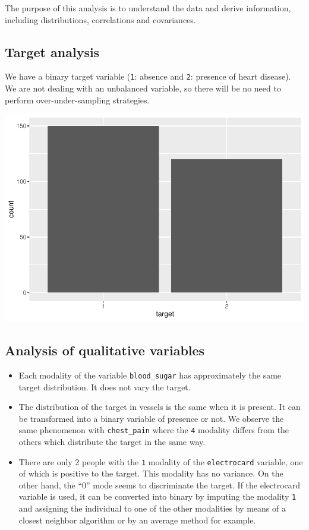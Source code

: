 \documentclass[
]{article}
\providecommand{\tightlist}{%
  \setlength{\itemsep}{0pt}\setlength{\parskip}{0pt}}
\begin{document}
The purpose of this analysis is to understand the data and derive
information, including distributions, correlations and covariances.

\hypertarget{target-analysis}{%
\subsection{Target analysis}\label{target-analysis}}

We have a binary target variable (\texttt{1}: absence and \texttt{2}:
presence of heart disease).\\
We are not dealing with an unbalanced variable, so there will be no need
to perform over-under-sampling strategies.

\includegraphics{hd_files/figure-latex/unnamed-chunk-13-1.pdf}

\hypertarget{analysis-of-qualitative-variables}{%
\subsection{Analysis of qualitative
variables}\label{analysis-of-qualitative-variables}}

\begin{itemize}
\tightlist
\item
  Each modality of the variable \texttt{blood\_sugar} has approximately
  the same target distribution. It does not vary the target.
\item
  The distribution of the target in vessels is the same when it is
  present. It can be transformed into a binary variable of presence or
  not. We observe the same phenomenon with \texttt{chest\_pain} where
  the \texttt{4} modality differs from the others which distribute the
  target in the same way.
\item
  There are only 2 people with the \texttt{1} modality of the
  \texttt{electrocard} variable, one of which is positive to the target.
  This modality has no variance. On the other hand, the ``0'' mode seems
  to discriminate the target. If the electrocard variable is used, it
  can be converted into binary by imputing the modality \texttt{1} and
  assigning the individual to one of the other modalities by means of a
  closest neighbor algorithm or by an average method for example.
\end{itemize}
\end{document}

